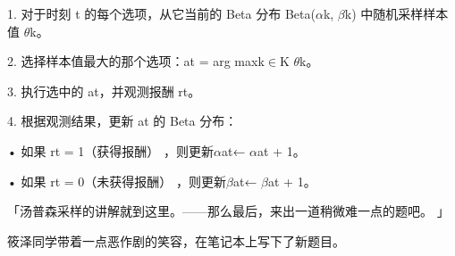 1. 对于时刻 t 的每个选项，从它当前的 Beta 分布 Beta($\alpha$k, $\beta$k) 中随机采样样本值 $\theta$k。\par
2. 选择样本值最大的那个选项：at = arg maxk$\in$K $\theta$k。\par
3. 执行选中的 at，并观测报酬 rt。\par
4. 根据观测结果，更新 at 的 Beta 分布：\par
• 如果 rt = 1（获得报酬） ，则更新$\alpha$at← $\alpha$at + 1。\par
• 如果 rt = 0（未获得报酬） ，则更新$\beta$at← $\beta$at + 1。\par
「汤普森采样的讲解就到这里。——那么最后，来出一道稍微难一点的题吧。 」\par
筱泽同学带着一点恶作剧的笑容，在笔记本上写下了新题目。\par

